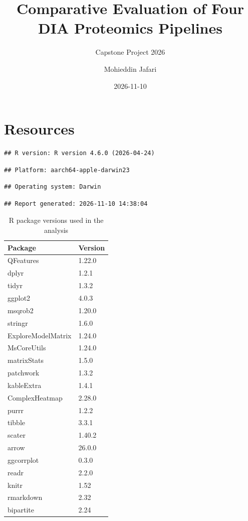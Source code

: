 \documentclass[
  10pt,
]{article}
\title{Comparative Evaluation of Four DIA Proteomics Pipelines}
\subtitle{Capstone Project 2026}
\author{Mohieddin Jafari}
\date{2026-11-10}
\begin{document}
\maketitle

{
\setcounter{tocdepth}{2}
\tableofcontents
}
\section{Resources}\label{resources}

\begin{verbatim}
## R version: R version 4.6.0 (2026-04-24)
\end{verbatim}

\begin{verbatim}
## Platform: aarch64-apple-darwin23
\end{verbatim}

\begin{verbatim}
## Operating system: Darwin
\end{verbatim}

\begin{verbatim}
## Report generated: 2026-11-10 14:38:04
\end{verbatim}

\begin{longtable}[t]{ll}
\caption{\label{tab:session_information}R package versions used in the analysis}\\
\toprule
Package & Version\\
\midrule
QFeatures & 1.22.0\\
dplyr & 1.2.1\\
tidyr & 1.3.2\\
ggplot2 & 4.0.3\\
msqrob2 & 1.20.0\\
\addlinespace
stringr & 1.6.0\\
ExploreModelMatrix & 1.24.0\\
MsCoreUtils & 1.24.0\\
matrixStats & 1.5.0\\
patchwork & 1.3.2\\
\addlinespace
kableExtra & 1.4.1\\
ComplexHeatmap & 2.28.0\\
purrr & 1.2.2\\
tibble & 3.3.1\\
scater & 1.40.2\\
\addlinespace
arrow & 26.0.0\\
ggcorrplot & 0.3.0\\
readr & 2.2.0\\
knitr & 1.52\\
rmarkdown & 2.32\\
\addlinespace
bipartite & 2.24\\
\bottomrule
\end{longtable}
\end{document}
